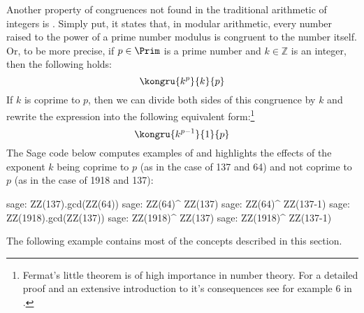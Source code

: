 Another property of congruences not found in the traditional arithmetic of integers is . Simply put, it states that, in modular arithmetic, every number raised to the power of a prime number modulus is congruent to the number itself. Or, to be more precise, if $ p \in \Prim $ is a prime number and $ k \in \mathbb{Z} $ is an integer, then the following holds:
\begin{equation}\label{fermats-little-theorem}
\kongru{k ^ p}{k}{p} 
\end{equation}
If $k$ is coprime to $p$, then we can divide both sides of this congruence by $k$ and rewrite the expression into the following equivalent form:\footnote{Fermat’s little theorem is of high importance in number theory. For a detailed proof and an extensive introduction to it’s consequences see for example \chaptname{} 6 in \cite{hardy-2008}.}
\begin{equation}
\label{eq_fermat_lt_2}
\kongru{k ^{p-1}}{1}{p}
\end{equation}
The  Sage code below computes examples of  and highlights the effects of the exponent $k$ being coprime to $p$ (as in the case of 137 and 64) and not coprime to $p$ (as in the case of 1918 and 137):
\begin{sagecommandline}
sage: ZZ(137).gcd(ZZ(64))
sage: ZZ(64)^ ZZ(137) %
sage: ZZ(64)^ ZZ(137-1) %
sage: ZZ(1918).gcd(ZZ(137))
sage: ZZ(1918)^ ZZ(137) %
sage: ZZ(1918)^ ZZ(137-1) %
\end{sagecommandline}

The following example  contains most of the concepts described in this section.

